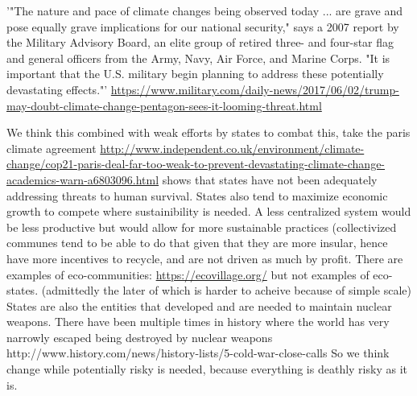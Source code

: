 \documentclass[11pt]{article}
\begin{document}
'"The nature and pace of climate changes being observed today ... are grave and pose equally grave implications for our national security," says a 2007 report by the Military Advisory Board, an elite group of retired three- and four-star flag and general officers from the Army, Navy, Air Force, and Marine Corps. "It is important that the U.S. military begin planning to address these potentially devastating effects."' \url{https://www.military.com/daily-news/2017/06/02/trump-may-doubt-climate-change-pentagon-sees-it-looming-threat.html}

We think this combined with weak efforts by states to combat this, take the paris climate agreement \url{http://www.independent.co.uk/environment/climate-change/cop21-paris-deal-far-too-weak-to-prevent-devastating-climate-change-academics-warn-a6803096.html} shows that states have not been adequately addressing threats to human survival. States also tend to maximize economic growth to compete where sustainibility is needed. A less centralized system would be less productive but would allow for more sustainable practices (collectivized communes tend to be able to do that given that they are more insular, hence have more incentives to recycle, and are not driven as much by profit. There are examples of eco-communities: \url{https://ecovillage.org/} but not examples of eco-states. (admittedly the later of which is harder to acheive because of simple scale) States are also the entities that developed and are needed to maintain nuclear weapons. There have been multiple times in history where the world has very narrowly escaped being destroyed by nuclear weapons http://www.history.com/news/history-lists/5-cold-war-close-calls So we think change while potentially risky is needed, because everything is deathly risky as it is.
\end{document}
